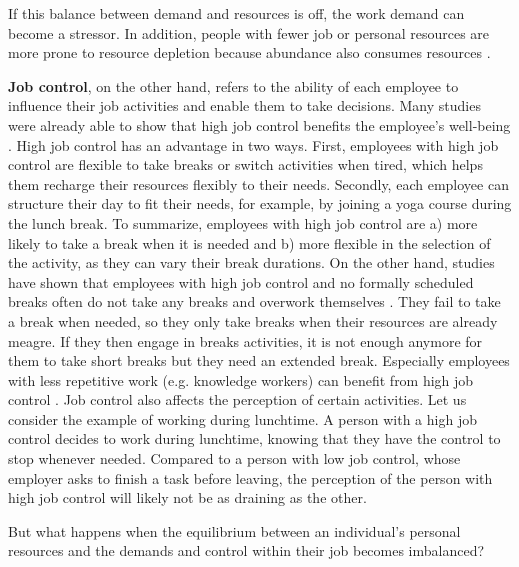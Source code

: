\documentclass{hasel_thesis}
\begin{document}
If this balance between demand and resources is off, the work demand can become a stressor. In addition, people with fewer job or personal resources are more prone to resource depletion because abundance also consumes resources \cite{Trougakos.2009}. 

\textbf{Job control}, on the other hand, refers to the ability of each employee to influence their job activities \cite{Trougakos.2009} and enable them to take decisions. Many studies were already able to show that high job control benefits the employee's well-being \cite{Daniels.1994, Jackson.1983}. High job control has an advantage in two ways. First, employees with high job control are flexible to take breaks or switch activities when tired, which helps them recharge their resources flexibly to their needs. Secondly, each employee can structure their day to fit their needs, for example, by joining a yoga course during the lunch break. To summarize, employees with high job control are 
a) more likely to take a break when it is needed and 
b) more flexible in the selection of the activity, as they can vary their break durations.
On the other hand, studies have shown that employees with high job control and no formally scheduled breaks often do not take any breaks and overwork themselves \cite{McLean.2001}. They fail to take a break when needed, so they only take breaks when their resources are already meagre. If they then engage in breaks activities, it is not enough anymore for them to take short breaks but they need an extended break. Especially employees with less repetitive work (e.g. knowledge workers) can benefit from high job control \cite{Trougakos.2009}. Job control also affects the perception of certain activities. Let us consider the example of working during lunchtime. A person with a high job control decides to work during lunchtime, knowing that they have the control to stop whenever needed. Compared to a person with low job control, whose employer asks to finish a task before leaving, the perception of the person with high job control will likely not be as draining as the other.

But what happens when the equilibrium between an individual's personal resources and the demands and control within their job becomes imbalanced?
\end{document}
